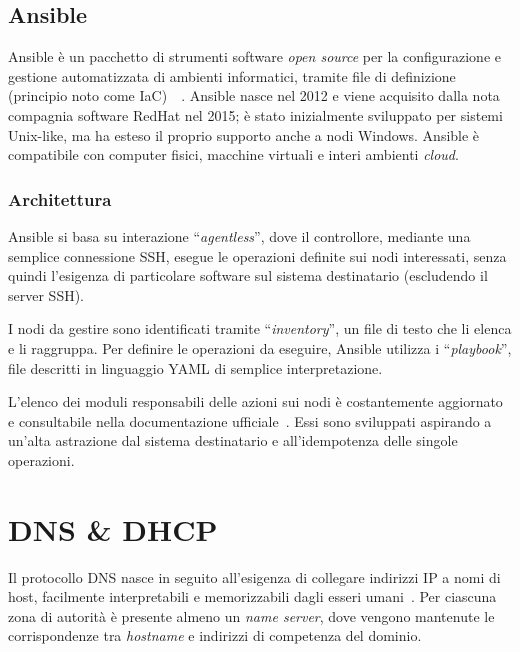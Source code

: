 \documentclass[12pt,a4paper,twoside,openright]{book}
\begin{document}
\subsection{Ansible}
Ansible è un pacchetto di strumenti software \textit{open source} per la configurazione e gestione automatizzata di ambienti informatici, tramite file di definizione (principio noto come \acf{IaC})~\cite{ansiblewiki}~\cite{iacwiki}. Ansible nasce nel 2012 e viene acquisito dalla nota compagnia software RedHat nel 2015; è stato inizialmente sviluppato per sistemi Unix-like, ma ha esteso il proprio supporto anche a nodi Windows. Ansible è compatibile con computer fisici, macchine virtuali e interi ambienti \textit{cloud}.

\subsubsection{Architettura}
Ansible si basa su interazione ``\textit{agentless}'', dove il controllore, mediante una semplice connessione \acf{SSH}, esegue le operazioni definite sui nodi interessati, senza quindi l'esigenza di particolare software sul sistema destinatario (escludendo il server \ac{SSH}).

I nodi da gestire sono identificati tramite ``\textit{inventory}'', un file di testo che li elenca e li raggruppa. Per definire le operazioni da eseguire, Ansible utilizza i ``\textit{playbook}'', file descritti in linguaggio \ac{YAML} di semplice interpretazione.

L'elenco dei moduli responsabili delle azioni sui nodi è costantemente aggiornato e consultabile nella documentazione ufficiale~\cite{ansibledoc}. Essi sono sviluppati aspirando a un'alta astrazione dal sistema destinatario e all'idempotenza delle singole operazioni.

\section{DNS \& DHCP}
Il protocollo \acf{DNS} nasce in seguito all'esigenza di collegare indirizzi \ac{IP} a nomi di host, facilmente interpretabili e memorizzabili dagli esseri umani~\cite{dnswiki}. Per ciascuna zona di autorità è presente almeno un \textit{name server}, dove vengono mantenute le corrispondenze tra \textit{hostname} e indirizzi di competenza del dominio.
\end{document}
